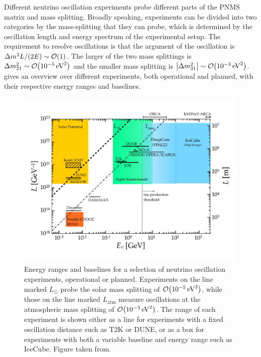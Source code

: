 Different neutrino oscillation experiments probe different parts of the PNMS matrix and mass splitting. Broadly speaking, experiments can be divided into two categories by the mass-splitting that they can probe, which is determined by the oscillation length and energy spectrum of the experimental setup. The requirement to resolve oscillations is that the argument of the oscillation is $\Delta m^2 L/(2E) \sim \order{1}$. The larger of the two mass splittings is $\Delta m^2_{21} \sim \order{\SI{e-5}{eV^2}}$ and the smaller mass splitting is $\abs{\Delta m^2_{31}} \sim \order{\SI{e-3}{eV^2}}$.  gives an overview over different experiments, both operational and planned, with their respective energy ranges and baselines.
\begin{figure}
    \centering
    \includegraphics{figures/theory/LvsE.pdf}
    \caption{Energy ranges and baselines for a selection of neutrino oscillation experiments, operational or planned. Experiments on the line marked $L_{\odot}$ probe the solar mass splitting of $\order{\SI{e-5}{eV^2}}$, while those on the line marked $L_\mathrm{atm}$ measure oscillations at the atmospheric mass splitting of $\order{\SI{e-3}{eV^2}}$. The range of each experiment is shown either as a line for experiments with a fixed oscillation distance such as T2K or DUNE, or as a box for experiments with both a variable baseline and energy range such as IceCube. Figure taken from\cite{IceCube:2016xxt}.\label{fig:oscillation-experiments-overview}}
\end{figure}

